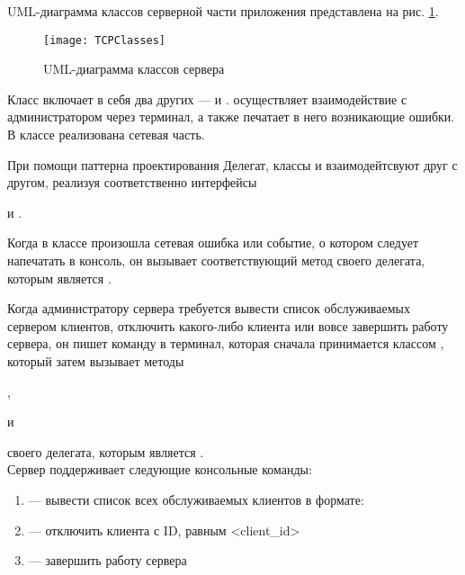 UML-диаграмма классов серверной части приложения представлена на рис. \ref{fig:tcp-classes}.

\begin{figure}[H]
	\centering
	\texttt{[image: TCPClasses]}
	\caption{UML-диаграмма классов  сервера}
	\label{fig:tcp-classes}
\end{figure}

Класс  включает в себя два других ---  и .  осуществляет взаимодействие с администратором через терминал, а также печатает в него возникающие ошибки.  В классе  реализована сетевая часть. 

При помощи паттерна проектирования Делегат, классы  и  взаимодейтсвуют друг с другом, реализуя соответственно интерфейсы 

 и .

Когда в классе  произошла сетевая ошибка или событие, о котором следует напечатать в консоль, он вызывает соответствующий метод  своего делегата, которым является .

Когда администратору сервера требуется вывести список обслуживаемых сервером клиентов, отключить какого-либо клиента или вовсе завершить работу сервера, он пишет команду в терминал, которая сначала принимается классом , который затем вызывает методы

,

 и 
 
 своего делегата, которым является .\\[3mm]

Сервер поддерживает следующие консольные команды:

\begin{enumerate}
	\item {} --- вывести список всех обслуживаемых клиентов в формате:\\ 
	\item {} --- отключить клиента с ID, равным <client\_id>
	\item {} --- завершить работу сервера
\end{enumerate}

